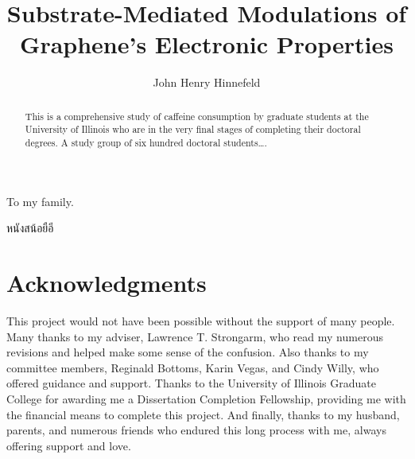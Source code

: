 \documentclass[edeposit,fullpage,draftthesis]{uiucthesis2009}
\begin{document}
\title{Substrate-Mediated Modulations of Graphene's Electronic Properties}
\author{John Henry Hinnefeld}
\phdthesis
{}
\maketitle

\frontmatter

\begin{abstract}
This is a comprehensive study of caffeine consumption by graduate
students at the University of Illinois who are in the very final
stages of completing their doctoral degrees. A study group of six
hundred doctoral students\ldots.
\end{abstract}

\begin{dedication}
To my family.

\foreignlanguage{thai}{\textthai{หนังสน้อยือี}}

\end{dedication}

\chapter*{Acknowledgments}

This project would not have been possible without the support of
many people. Many thanks to my adviser, Lawrence T. Strongarm, who
read my numerous revisions and helped make some sense of the
confusion. Also thanks to my committee members, Reginald Bottoms,
Karin Vegas, and Cindy Willy, who offered guidance and support.
Thanks to the University of Illinois Graduate College for awarding
me a Dissertation Completion Fellowship, providing me with the
financial means to complete this project. And finally, thanks to
my husband, parents, and numerous friends who endured this long
process with me, always offering support and love.
\end{document}
